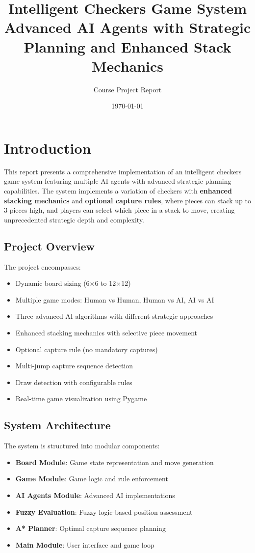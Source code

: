 \documentclass[12pt,a4paper]{article}
\title{\textbf{Intelligent Checkers Game System} \\ 
       \Large{Advanced AI Agents with Strategic Planning and Enhanced Stack Mechanics}}
\author{Course Project Report}
\date{\today}
\begin{document}
\maketitle
\tableofcontents
\newpage

\section{Introduction}

This report presents a comprehensive implementation of an intelligent checkers game system featuring multiple AI agents with advanced strategic planning capabilities. The system implements a variation of checkers with \textbf{enhanced stacking mechanics} and \textbf{optional capture rules}, where pieces can stack up to 3 pieces high, and players can select which piece in a stack to move, creating unprecedented strategic depth and complexity.

\subsection{Project Overview}

The project encompasses:
\begin{itemize}
    \item Dynamic board sizing (6×6 to 12×12)
    \item Multiple game modes: Human vs Human, Human vs AI, AI vs AI
    \item Three advanced AI algorithms with different strategic approaches
    \item Enhanced stacking mechanics with selective piece movement
    \item Optional capture rule (no mandatory captures)
    \item Multi-jump capture sequence detection
    \item Draw detection with configurable rules
    \item Real-time game visualization using Pygame
\end{itemize}

\subsection{System Architecture}

The system is structured into modular components:
\begin{itemize}
    \item \textbf{Board Module}: Game state representation and move generation
    \item \textbf{Game Module}: Game logic and rule enforcement
    \item \textbf{AI Agents Module}: Advanced AI implementations
    \item \textbf{Fuzzy Evaluation}: Fuzzy logic-based position assessment
    \item \textbf{A* Planner}: Optimal capture sequence planning
    \item \textbf{Main Module}: User interface and game loop
\end{itemize}
\end{document}
